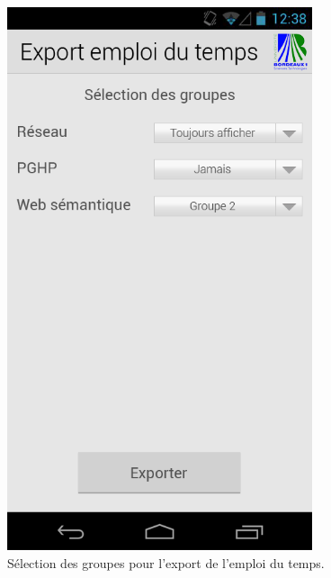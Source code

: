 \documentclass [pdftex,12pt] {report}
\begin{document}
\begin{figure}
\begin{minipage}[t]{8cm}
    \includegraphics[width=0.8\textwidth]{resources/ui_preview/08}
    \caption{Sélection des groupes pour l'export de l'emploi du temps.}
    \label{fig:08}
  \end{minipage}
  \hspace{-60pt}
\end{figure}
\end{document}

